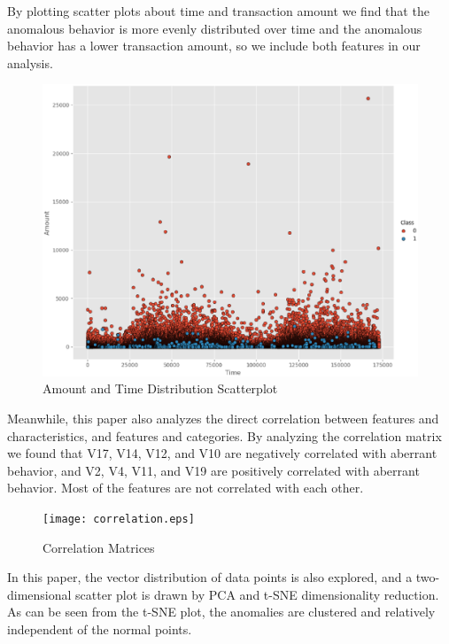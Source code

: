 By plotting scatter plots about time and transaction amount we find that the anomalous behavior is more evenly distributed over time and the anomalous behavior has a lower transaction amount, so we include both features in our analysis.
\begin{figure}[H]
  \centering
{}
\includegraphics[scale=0.45]{amounttime.eps}
\caption{Amount and Time Distribution Scatterplot}\label{fig:OutAspect-target}
\end{figure}
Meanwhile, this paper also analyzes the direct correlation between features and characteristics, and features and categories. By analyzing the correlation matrix we found that V17, V14, V12, and V10 are negatively correlated with aberrant behavior, and V2, V4, V11, and V19 are positively correlated with aberrant behavior. Most of the features are not correlated with each other.
\begin{figure}[H]
	\centering
	\texttt{[image: correlation.eps]}
	\caption{Correlation Matrices}\label{fig:OutAspect-target}
\end{figure}
In this paper, the vector distribution of data points is also explored, and a two-dimensional scatter plot is drawn by PCA and t-SNE dimensionality reduction. As can be seen from the t-SNE plot, the anomalies are clustered and relatively independent of the normal points.


